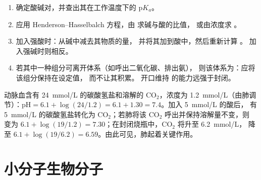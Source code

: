\begin{method}[缓冲液计算]\label{met:b1:water-small-molecules:bufferarith}
\begin{enumerate}
  \item 确定酸碱对，并查出其在工作温度下的
        p$K_a$。
  \item 应用 Henderson--Hasselbalch 方程，由  求碱与酸的比值，
        或由浓度求 。
  \item 加入强酸时：从碱中减去其物质的量，
        并将其加到酸中，然后重新计算 。
        加入强碱时则相反。
  \item 若其中一种组分可离开体系（如呼出二氧化碳、排出氨），
        则该体系为\emph{}：应将该组分保持在设定值，
        而不让其积累。
        开口维持  的能力远强于封闭。
\end{enumerate}
\end{method}

\begin{example}[血液]\label{ex:b1:water-small-molecules:blood}
动脉血含有 \qty{24}{mmol/L} 的碳酸氢盐和溶解的
$\mathrm{CO_2}$，浓度为 \qty{1.2}{mmol/L}（由肺调节）：$\mathrm{pH} =
6.1 + \log(24/1.2) = 6.1 + 1.30 = 7.4$。加入 \qty{5}{mmol/L} 的酸后，
有 \qty{5}{mmol/L} 的碳酸氢盐转化为 $\mathrm{CO_2}$；若肺将该 $\mathrm{CO_2}$
呼出并保持溶解量不变，则 
变为 $6.1 + \log(19/1.2) = 7.30$；在封闭烧瓶中，$\mathrm{CO_2}$
将升至 \qty{6.2}{mmol/L}， 降至 $6.1 + \log(19/6.2) =
6.59$。由此可见，肺起着关键作用。
\end{example}

\section{小分子生物分子}

